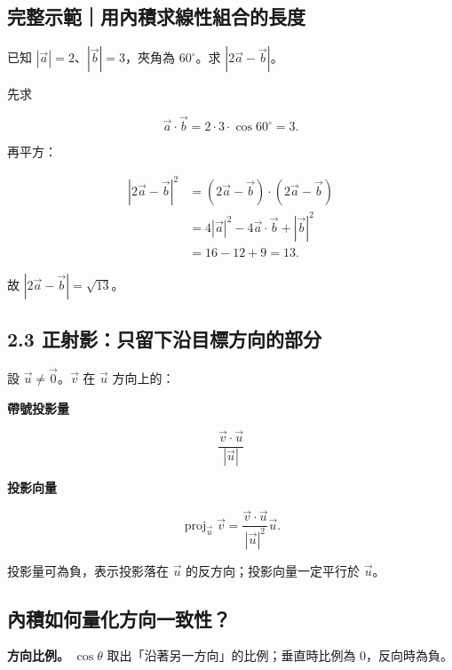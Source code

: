 \documentclass[11pt,a4paper]{article}
\begin{document}
\begin{HandoutWorkedExample}

\subsection{完整示範｜用內積求線性組合的長度}\label{ux5b8cux6574ux793aux7bc4ux7528ux5167ux7a4dux6c42ux7ddaux6027ux7d44ux5408ux7684ux9577ux5ea6}

已知 \(|\vec a|=2\)、\(|\vec b|=3\)，夾角為 \(60^\circ\)。求 \(|2\vec a-\vec b|\)。

先求

\[
\vec a\cdot\vec b
=2\cdot3\cdot\cos60^\circ
=3.
\]

再平方：

\[
\begin{aligned}
|2\vec a-\vec b|^2
&=(2\vec a-\vec b)\cdot(2\vec a-\vec b)\\
&=4|\vec a|^2-4\vec a\cdot\vec b+|\vec b|^2\\
&=16-12+9=13.
\end{aligned}
\]

故 \(\boxed{|2\vec a-\vec b|=\sqrt{13}}\)。

\end{HandoutWorkedExample}

\subsection{2.3 正射影：只留下沿目標方向的部分}\label{ux6b63ux5c04ux5f71ux53eaux7559ux4e0bux6cbfux76eeux6a19ux65b9ux5411ux7684ux90e8ux5206}

設 \(\vec u\ne\vec0\)。\(\vec v\) 在 \(\vec u\) 方向上的：

\textbf{帶號投影量}

\[
\boxed{\frac{\vec v\cdot\vec u}{|\vec u|}}
\]

\textbf{投影向量}

\[
\boxed{
\operatorname{proj}_{\vec u}\vec v
=\frac{\vec v\cdot\vec u}{|\vec u|^2}\vec u
}.
\]

投影量可為負，表示投影落在 \(\vec u\) 的反方向；投影向量一定平行於 \(\vec u\)。

\subsection{內積如何量化方向一致性？}\label{ux5167ux7a4dux5982ux4f55ux91cfux5316ux65b9ux5411ux4e00ux81f4ux6027}

\textbf{方向比例。} \(\cos\theta\) 取出「沿著另一方向」的比例；垂直時比例為 \(0\)，反向時為負。
\end{document}
